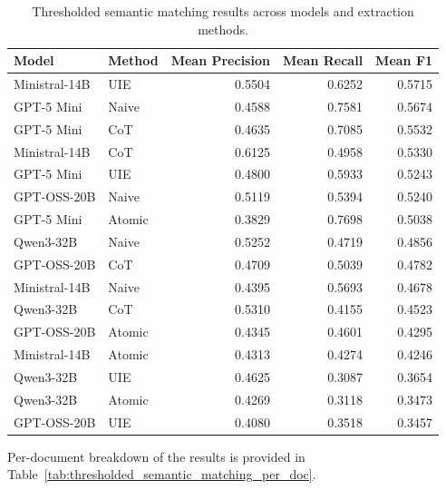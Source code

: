 \begin{table}[htbp]
	\centering
	\caption{Thresholded semantic matching results across models and extraction methods.}
	\label{tab:thresholded_semantic_matching}
	\begin{tabular}{llrrr}
		\toprule
		\textbf{Model} & \textbf{Method} & \textbf{Mean Precision} & \textbf{Mean Recall} & \textbf{Mean F1} \\
		\midrule
		Ministral-14B & UIE   & 0.5504 & 0.6252 & 0.5715 \\
		GPT-5 Mini    & Naive & 0.4588 & 0.7581 & 0.5674 \\
		GPT-5 Mini    & CoT   & 0.4635 & 0.7085 & 0.5532 \\
		Ministral-14B & CoT   & 0.6125 & 0.4958 & 0.5330 \\
		GPT-5 Mini    & UIE   & 0.4800 & 0.5933 & 0.5243 \\
		GPT-OSS-20B   & Naive & 0.5119 & 0.5394 & 0.5240 \\
		GPT-5 Mini    & Atomic & 0.3829 & 0.7698 & 0.5038 \\
		Qwen3-32B     & Naive & 0.5252 & 0.4719 & 0.4856 \\
		GPT-OSS-20B   & CoT   & 0.4709 & 0.5039 & 0.4782 \\
		Ministral-14B & Naive & 0.4395 & 0.5693 & 0.4678 \\
		Qwen3-32B     & CoT   & 0.5310 & 0.4155 & 0.4523 \\
		GPT-OSS-20B   & Atomic & 0.4345 & 0.4601 & 0.4295 \\
		Ministral-14B & Atomic & 0.4313 & 0.4274 & 0.4246 \\
		Qwen3-32B     & UIE   & 0.4625 & 0.3087 & 0.3654 \\
		Qwen3-32B     & Atomic & 0.4269 & 0.3118 & 0.3473 \\
		GPT-OSS-20B   & UIE   & 0.4080 & 0.3518 & 0.3457 \\
		\bottomrule
	\end{tabular}
\end{table}

Per-document breakdown of the results is provided in Table~\ref{tab:thresholded_semantic_matching_per_doc}.

